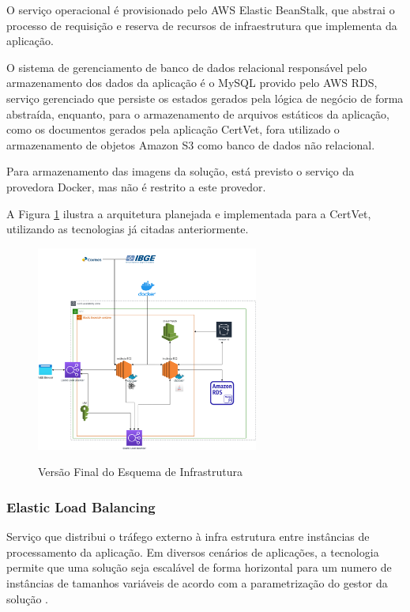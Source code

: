 \documentclass[
    12pt,               %
    openright,          %
    oneside,
    a4paper,            %
    BIBLATEX,           %
    TODO,               %
    english,            %
    brazil              %
    ]{ifsp-spo-inf-ctds}
\begin{document}
        O serviço operacional é provisionado pelo AWS Elastic BeanStalk, que abstrai o processo de requisição e reserva de recursos de infraestrutura que implementa da aplicação.

        O sistema de gerenciamento de banco de dados relacional responsável pelo armazenamento dos dados da aplicação é o MySQL provido pelo AWS RDS, serviço gerenciado que persiste os estados gerados pela lógica de negócio de forma abstraída, enquanto, para o armazenamento de arquivos estáticos da aplicação, como os documentos gerados pela aplicação CertVet, fora utilizado o armazenamento de objetos Amazon S3 como banco de dados não relacional.

        Para armazenamento das imagens da solução, está previsto o serviço da provedora Docker, mas não é restrito a este provedor.

        A Figura \ref{fig:infra3} ilustra a arquitetura planejada e implementada para a CertVet, utilizando as tecnologias já citadas anteriormente.


        \begin{figure}[H]
            \centering
            \caption{Versão Final do Esquema de Infrastrutura}
            \centering
            \includegraphics[width=0.65\textwidth]{images/ArquiteturaAplicacao_v6.png}
            \label{fig:infra3}
        \end{figure} 

        \subsubsection{Elastic Load Balancing}

            Serviço que distribui o tráfego externo à infra estrutura entre instâncias de processamento da aplicação. Em diversos cenários de aplicações, a tecnologia permite que uma solução seja escalável de forma horizontal para um numero de instâncias de tamanhos variáveis de acordo com a parametrização do gestor da solução .
\end{document}
